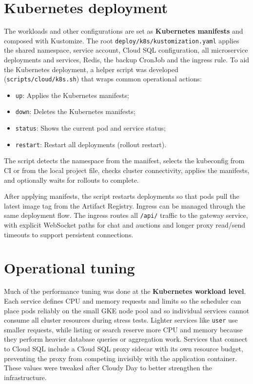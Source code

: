 \section{Kubernetes deployment}

The workloads and other configurations are set as \textbf{Kubernetes manifests} and composed with Kustomize. The root \texttt{deploy/k8s/kustomization.yaml} applies the shared namespace, service account, Cloud SQL configuration, all microservice deployments and services, Redis, the backup CronJob and the ingress rule. To aid the Kubernetes deployment, a helper script was developed (\texttt{scripts/cloud/k8s.sh}) that wraps common operational actions:

\begin{itemize}
    \item \texttt{up}: Applies the Kubernetes manifests;
    \item \texttt{down}: Deletes the Kubernetes manifests;
    \item \texttt{status}: Shows the current pod and service status;
    \item \texttt{restart}: Restart all deployments (rollout restart).
\end{itemize}

The script detects the namespace from the manifest, selects the kubeconfig from CI or from the local project file, checks cluster connectivity, applies the manifests, and optionally waits for rollouts to complete.

After applying manifests, the script restarts deployments so that pods pull the latest image tag from the Artifact Registry. Ingress can be managed through the same deployment flow. The ingress routes all \texttt{/api/} traffic to the gateway service, with explicit WebSocket paths for chat and auctions and longer proxy read/send timeouts to support persistent connections.

\section{Operational tuning}

Much of the performance tuning was done at the \textbf{Kubernetes workload level}. Each service defines CPU and memory requests and limits so the scheduler can place pods reliably on the small GKE node pool and so individual services cannot consume all cluster resources during stress tests. Lighter services like \texttt{user} use smaller requests, while listing or search reserve more CPU and memory because they perform heavier database queries or aggregation work. Services that connect to Cloud SQL include a Cloud SQL proxy sidecar with its own resource budget, preventing the proxy from competing invisibly with the application container. These values were tweaked after Cloudy Day to better strengthen the infrastructure.

